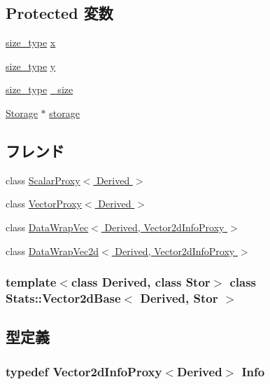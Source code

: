\subsection*{Protected 変数}
\begin{DoxyCompactItemize}
\item 
\hyperlink{namespaceStats_ada51e68d31936547d3729c82daf6b7c6}{size\_\-type} \hyperlink{classStats_1_1Vector2dBase_afe813128131dd3b6a82dd08a2f6786b5}{x}
\item 
\hyperlink{namespaceStats_ada51e68d31936547d3729c82daf6b7c6}{size\_\-type} \hyperlink{classStats_1_1Vector2dBase_a1b61fe296b3ed741d2e46c445c0d0675}{y}
\item 
\hyperlink{namespaceStats_ada51e68d31936547d3729c82daf6b7c6}{size\_\-type} \hyperlink{classStats_1_1Vector2dBase_a9f1927ae81f20205d93e0b86915f27d7}{\_\-size}
\item 
\hyperlink{classStats_1_1Vector2dBase_a5d4a6db0e7c32292f54a08d05c671bd1}{Storage} $\ast$ \hyperlink{classStats_1_1Vector2dBase_a1b410f65a3077609e9b1902c52136304}{storage}
\end{DoxyCompactItemize}
\subsection*{フレンド}
\begin{DoxyCompactItemize}
\item 
class \hyperlink{classStats_1_1Vector2dBase_a339d5293ff5abbd173dd47aa666bb3c4}{ScalarProxy$<$ Derived $>$}
\item 
class \hyperlink{classStats_1_1Vector2dBase_a6039c79f795dd69fbd06284ff35d36dc}{VectorProxy$<$ Derived $>$}
\item 
class \hyperlink{classStats_1_1Vector2dBase_acbe1926908b84a880845fc330f5e33d0}{DataWrapVec$<$ Derived, Vector2dInfoProxy $>$}
\item 
class \hyperlink{classStats_1_1Vector2dBase_a8a0ac0473edb366d128fff87d8ce7994}{DataWrapVec2d$<$ Derived, Vector2dInfoProxy $>$}
\end{DoxyCompactItemize}
\subsubsection*{template$<$class Derived, class Stor$>$ class Stats::Vector2dBase$<$ Derived, Stor $>$}



\subsection{型定義}
\hypertarget{classStats_1_1Vector2dBase_a54a1e5a7adf65227680acc9effe631ac}{
\subsubsection[{Info}]{\setlength{\rightskip}{0pt plus 5cm}typedef {\bf Vector2dInfoProxy}$<$Derived$>$ {\bf Info}}}
\label{classStats_1_1Vector2dBase_a54a1e5a7adf65227680acc9effe631ac}


